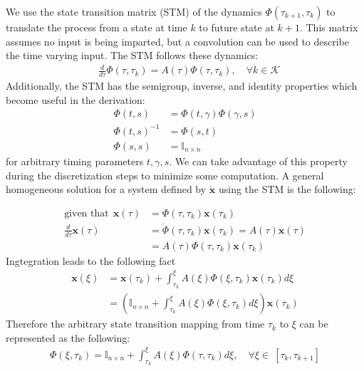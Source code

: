 We use the state transition matrix (STM) of the dynamics $\Phi(\tau_{k+1},\tau_k)$ to translate the process from a state at time $k$ to future state at $k+1$. This matrix assumes no input is being imparted, but a convolution can be used to describe the time varying input. The STM follows these dynamics:
%
\begin{align}
& \frac{d}{d\tau} \Phi(\tau,\tau_k) = A(\tau) \Phi(\tau,\tau_k), \quad \forall k \in \mathcal{K}
\end{align}
Additionally, the STM has the semigroup, inverse, and identity properties which become useful in the derivation:
\begin{align}
	\Phi(t,s) &= \Phi(t, \gamma)\Phi(\gamma, s) \\
	\Phi(t,s)^{-1} &= \Phi(s,t) \\
	\Phi(s,s) &= \mathbb{I}_{n \times n}
\end{align}
for arbitrary timing parameters $t, \gamma, s$. We can take advantage of this property during the discretization steps to minimize some computation. A general homogeneous solution for a system defined by $\dot{\mathbf{x}}$ using the STM is the following:

\begin{align}
	\text{given that} \ \ \mathbf{x}(\tau) &= \Phi(\tau, \tau_k) \mathbf{x}(\tau_k)\\
	\frac{d}{d\tau}\mathbf{x}(\tau) &= \dot{\Phi}(\tau, \tau_k) \mathbf{x}(\tau_k) = A(\tau)\mathbf{x}(\tau) \\ 
	& = A(\tau) \Phi(\tau, \tau_k) \mathbf{x}(\tau_k)
\end{align}
Ingtegration leads to the following fact
\begin{align}
	\mathbf{x}(\xi) &= \mathbf{x}(\tau_k) + \int_{\tau_k}^\xi A(\xi) \Phi(\xi, \tau_k) \mathbf{x}(\tau_k) d\xi \\
	&= \left( \mathbb{I}_{n\times n} + \int_{\tau_k}^\xi A(\xi) \Phi(\xi, \tau_k) d\xi \right)  \mathbf{x}(\tau_k)
\end{align}
Therefore the arbitrary state transition mapping from time $\tau_k$ to $\xi$ can be represented as the following:
\begin{align}
	\Phi(\xi, \tau_k) = \mathbb{I}_{n\times n} + \int_{\tau_k}^\xi A(\xi) \Phi(\tau, \tau_k) d\xi, \quad \forall \xi \in \ [\tau_k, \tau_{k+1}]
\end{align}


